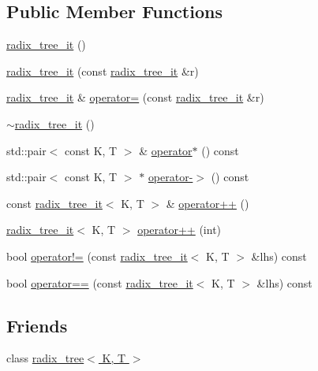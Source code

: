 \subsection*{Public Member Functions}
\begin{DoxyCompactItemize}
\item 
\hyperlink{classradix__tree__it_ab32c43daa26d8df9031813b820bfe30f}{radix\+\_\+tree\+\_\+it} ()
\item 
\hyperlink{classradix__tree__it_a2817b4be2cc40a29a380175c9c774028}{radix\+\_\+tree\+\_\+it} (const \hyperlink{classradix__tree__it}{radix\+\_\+tree\+\_\+it} \&r)
\item 
\hyperlink{classradix__tree__it}{radix\+\_\+tree\+\_\+it} \& \hyperlink{classradix__tree__it_a2aae5ad4b5b2dacd5f77429c92fa5687}{operator=} (const \hyperlink{classradix__tree__it}{radix\+\_\+tree\+\_\+it} \&r)
\item 
\hyperlink{classradix__tree__it_a678a52ad4a84891319e79cc83046eb00}{$\sim$radix\+\_\+tree\+\_\+it} ()
\item 
std\+::pair$<$ const K, T $>$ \& \hyperlink{classradix__tree__it_ad729635bf943750c84a391adfab650d5}{operator$\ast$} () const 
\item 
std\+::pair$<$ const K, T $>$ $\ast$ \hyperlink{classradix__tree__it_af9625539926f984aea370867e96aa985}{operator-\/$>$} () const 
\item 
const \hyperlink{classradix__tree__it}{radix\+\_\+tree\+\_\+it}$<$ K, T $>$ \& \hyperlink{classradix__tree__it_aeaee75d1faafcd02ec5ff9c0fa161818}{operator++} ()
\item 
\hyperlink{classradix__tree__it}{radix\+\_\+tree\+\_\+it}$<$ K, T $>$ \hyperlink{classradix__tree__it_abd41bd4b4e1b5f7b95ec8c99030c37ae}{operator++} (int)
\item 
bool \hyperlink{classradix__tree__it_aaae533a0e6ad7b243f567798bbfdfa2b}{operator!=} (const \hyperlink{classradix__tree__it}{radix\+\_\+tree\+\_\+it}$<$ K, T $>$ \&lhs) const 
\item 
bool \hyperlink{classradix__tree__it_a0b7c9edd34bd97a360b6ca17de6b6534}{operator==} (const \hyperlink{classradix__tree__it}{radix\+\_\+tree\+\_\+it}$<$ K, T $>$ \&lhs) const 
\end{DoxyCompactItemize}
\subsection*{Friends}
\begin{DoxyCompactItemize}
\item 
class \hyperlink{classradix__tree__it_a0596aeb27884e8ff44f365527f6a8f12}{radix\+\_\+tree$<$ K, T $>$}
\end{DoxyCompactItemize}



